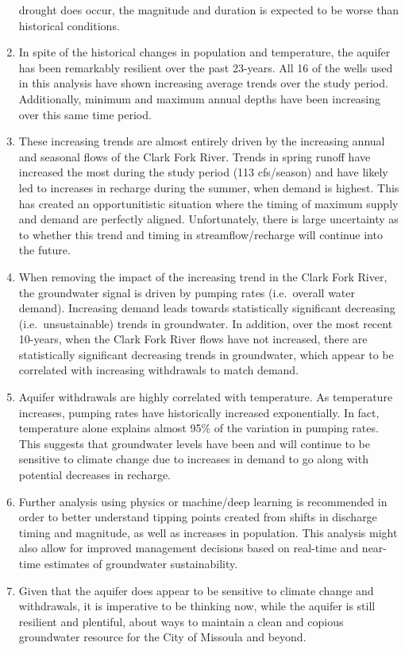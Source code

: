 \documentclass[
  letterpaper,
  DIV=11,
  numbers=noendperiod]{scrartcl}
\begin{document}
\begin{enumerate}
  drought does occur, the magnitude and duration is expected to be worse
  than historical conditions.
\item
  In spite of the historical changes in population and temperature, the
  aquifer has been remarkably resilient over the past 23-years. All 16
  of the wells used in this analysis have shown increasing average
  trends over the study period. Additionally, minimum and maximum annual
  depths have been increasing over this same time period.\\
\item
  These increasing trends are almost entirely driven by the increasing
  annual and seasonal flows of the Clark Fork River. Trends in spring
  runoff have increased the most during the study period (113
  cfs/season) and have likely led to increases in recharge during the
  summer, when demand is highest. This has created an opportunitistic
  situation where the timing of maximum supply and demand are perfectly
  aligned. Unfortunately, there is large uncertainty as to whether this
  trend and timing in streamflow/recharge will continue into the
  future.\\
\item
  When removing the impact of the increasing trend in the Clark Fork
  River, the groundwater signal is driven by pumping rates (i.e.~overall
  water demand). Increasing demand leads towards statistically
  significant decreasing (i.e.~unsustainable) trends in groundwater. In
  addition, over the most recent 10-years, when the Clark Fork River
  flows have not increased, there are statistically significant
  decreasing trends in groundwater, which appear to be correlated with
  increasing withdrawals to match demand.
\item
  Aquifer withdrawals are highly correlated with temperature. As
  temperature increases, pumping rates have historically increased
  exponentially. In fact, temperature alone explains almost 95\% of the
  variation in pumping rates. This suggests that groundwater levels have
  been and will continue to be sensitive to climate change due to
  increases in demand to go along with potential decreases in recharge.
\item
  Further analysis using physics or machine/deep learning is recommended
  in order to better understand tipping points created from shifts in
  discharge timing and magnitude, as well as increases in population.
  This analysis might also allow for improved management decisions based
  on real-time and near-time estimates of groundwater sustainability.
\item
  Given that the aquifer does appear to be sensitive to climate change
  and withdrawals, it is imperative to be thinking now, while the
  aquifer is still resilient and plentiful, about ways to maintain a
  clean and copious groundwater resource for the City of Missoula and
  beyond.
\end{enumerate}
\end{document}
